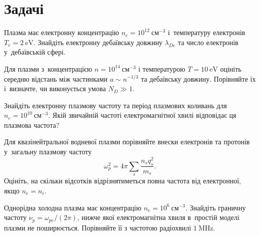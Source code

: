 \section*{Задачі}



 {}

\begin{problem}\label{prb:PlasmaDebye}
	 Плазма має електронну концентрацію $n_e=10^{12}~\mathrm{см}^{-3}$ і~температуру електронів $T_e=2~\mathrm{eV}$. Знайдіть електронну дебаївську довжину $\lambda_{De}$ та число електронів у~дебаївській сфері.
\end{problem}

\begin{problem}\label{prb:PlasmaCollective}
	 Для плазми з~концентрацією $n=10^{14}~\mathrm{см}^{-3}$ і температурою $T=10~\mathrm{eV}$ оцініть середню відстань між частинками $a\sim n^{-1/3}$ та дебаївську довжину. Порівняйте їх і~визначте, чи виконується умова $N_D\gg1$.
\end{problem}

\begin{problem}\label{prb:PlasmaFrequency}
	 Знайдіть електронну плазмову частоту та період плазмових коливань для $n_e=10^{10}~\mathrm{см}^{-3}$. Якій звичайній частоті електромагнітної хвилі відповідає ця плазмова частота?
\end{problem}

\begin{problem}\label{prb:PlasmaIons}
	 Для квазінейтральної водневої плазми порівняйте внески електронів та протонів у~загальну плазмову частоту
	\begin{equation*}
		\omega_p^2=4\pi\sum_s\frac{n_s q_s^2}{m_s}.
	\end{equation*}
	Оцініть, на скільки відсотків відрізнятиметься повна частота від електронної, якщо $n_e=n_i$.
\end{problem}

\begin{problem}\label{prb:PlasmaWave}
	 Однорідна холодна плазма має концентрацію $n_e=10^{6}~\mathrm{см}^{-3}$. Знайдіть граничну частоту $\nu_p=\omega_{pe}/(2\pi)$, нижче якої електромагнітна хвиля в~простій моделі плазми не поширюється. Порівняйте її з частотою радіохвилі $1~\mathrm{MHz}$.
\end{problem}

